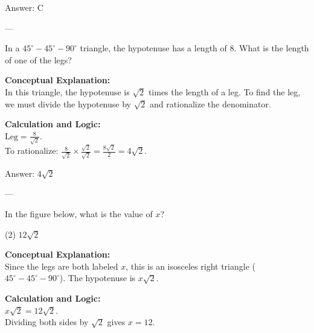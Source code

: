 \documentclass[11pt,paper=a4,answers]{exam}
\begin{document}
\begin{questions}
\begin{solution}
\vspace{15pt}
Answer: \colorbox{yellow!100}{C}
\end{solution}

---

\question
In a $45^\circ-45^\circ-90^\circ$ triangle, the hypotenuse has a length of $8$. What is the length of one of the legs?

\begin{solution}
\textbf{Conceptual Explanation:} \\
In this triangle, the hypotenuse is $\sqrt{2}$ times the length of a leg. To find the leg, we must divide the hypotenuse by $\sqrt{2}$ and rationalize the denominator.

\vspace{10pt}
\textbf{Calculation and Logic:} \\
$\text{Leg} = \frac{8}{\sqrt{2}}$. \\
To rationalize: $\frac{8}{\sqrt{2}} \times \frac{\sqrt{2}}{\sqrt{2}} = \frac{8\sqrt{2}}{2} = 4\sqrt{2}$.

\vspace{15pt}
Answer: \colorbox{yellow!100}{$4\sqrt{2}$}
\end{solution}

---

\question
In the figure below, what is the value of $x$?
\begin{center}
\end{center}
\begin{tasks}(2)
    \task $12\sqrt{2}$
\end{tasks}

\begin{solution}
\textbf{Conceptual Explanation:} \\
Since the legs are both labeled $x$, this is an isosceles right triangle ($45^\circ-45^\circ-90^\circ$). The hypotenuse is $x\sqrt{2}$.

\vspace{10pt}
\textbf{Calculation and Logic:} \\
$x\sqrt{2} = 12\sqrt{2}$. \\
Dividing both sides by $\sqrt{2}$ gives $x = 12$.


\end{solution}
\end{questions}
\end{document}
